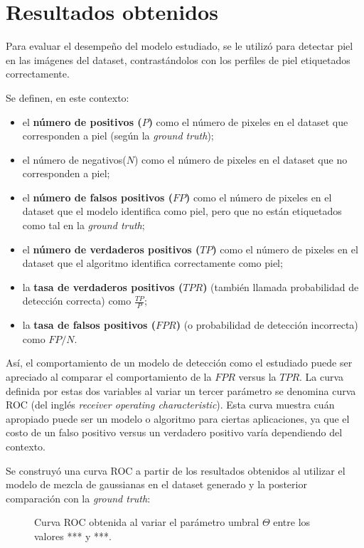 \documentclass[12pt]{article}
\begin{document}
\section{Resultados obtenidos}

Para evaluar el desempeño del modelo estudiado, se le utilizó para detectar piel
en las imágenes del dataset, contrastándolos con los perfiles de piel
etiquetados correctamente. 

Se definen, en este contexto: 

\begin{itemize}
    \item el \textbf{número de positivos ($P$)} como el número de pixeles en el dataset
        que corresponden a piel (según la \emph{ground truth});
    \item el número de negativos($N$) como el número de pixeles en el dataset
        que no corresponden a piel;
    \item el \textbf{número de falsos positivos ($FP$)} como el número de
        pixeles en el dataset que el modelo identifica como piel, pero que no
        están etiquetados como tal en la \emph{ground truth};
    \item el \textbf{número de verdaderos positivos ($TP$)} como el número de
        pixeles en el dataset que el algoritmo identifica correctamente como
        piel;
    \item la \textbf{tasa de verdaderos positivos ($TPR$)} (también llamada
        probabilidad de detección correcta) como $\frac{TP}{P}$;
    \item la \textbf{tasa de falsos positivos ($FPR$)} (o probabilidad de
        detección incorrecta) como $FP/N$.
\end{itemize}

Así, el comportamiento de un modelo de detección como el estudiado puede ser
apreciado al comparar el comportamiento de la $FPR$ versus la $TPR$. La curva
definida por estas dos variables al variar un tercer parámetro se denomina curva
ROC (del inglés \emph{receiver operating characteristic}). Esta curva muestra
cuán apropiado puede ser un modelo o algoritmo para ciertas aplicaciones, ya que
el costo de un falso positivo versus un verdadero positivo varía dependiendo del
contexto.

Se construyó una curva ROC a partir de los resultados obtenidos al utilizar el modelo de mezcla
de gaussianas en el dataset generado y la posterior comparación con la
\emph{ground truth}:


\begin{figure}[h]
    \centering
    \caption{Curva ROC obtenida al variar el parámetro umbral $\Theta$ entre los
    valores *** y ***.}
\end{figure}
\end{document}
